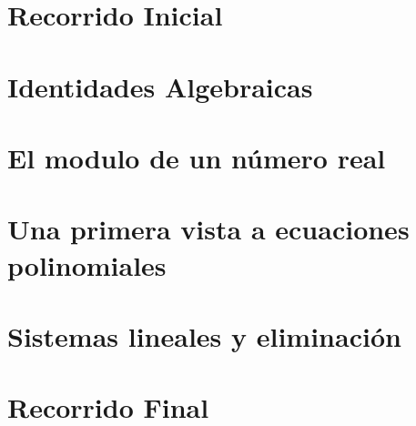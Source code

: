 \section{Recorrido Inicial}

\section{Identidades Algebraicas}

\section{El modulo de un n\'{u}mero real}

\section{Una primera vista a ecuaciones polinomiales}

\section{Sistemas lineales y eliminaci\'{o}n}

\section{Recorrido Final}
